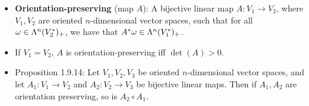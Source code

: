 \documentclass[../notes.tex]{subfiles}
\begin{document}
\begin{itemize}
\begin{proof}
        \begin{equation*}
            \det(A) = \det(B)\det(D)
        \end{equation*}
        It follows by Proposition 1.9.7 as well as the positivity of $\det(A)$ and $\det(B)$ that $\det(D)$ is positive, and hence the orientation of $e_{r+1},\dots,e_n$ and $f_{r+1},\dots,f_n$ are one and the same.
    \end{proof}
    \item \textbf{Orientation-preserving} (map $A$): A bijective linear map $A:V_1\to V_2$, where $V_1,V_2$ are oriented $n$-dimensional vector spaces, such that for all $\omega\in\lam[n]{V_2^*}_+$, we have that $A^*\omega\in\lam[n]{V_1^*}_+$.
    \item If $V_1=V_2$, $A$ is orientation-preserving iff $\det(A)>0$.
    \item Proposition 1.9.14: Let $V_1,V_2,V_3$ be oriented $n$-dimensional vector spaces, and let $A_1:V_1\to V_2$ and $A_2:V_2\to V_3$ be bijective linear maps. Then if $A_1,A_2$ are orientation preserving, so is $A_2\circ A_1$.
\end{itemize}
\end{document}
